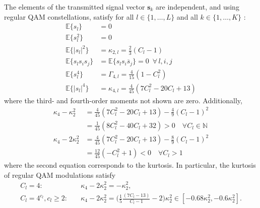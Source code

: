 The elements of the transmitted signal vector $\bm{s}_k$ are independent, and using regular QAM constellations, satisfy for all $l\in\{1,\ldots,L\}$ and all $k\in\{1,\ldots,K\}$ \cite{}:
\begin{subequations}
	\label{eqn:signal_moments}
	\begin{align}
	\mathbb{E}\{s_{l}\}&= 0\\
	\mathbb{E}\{s_{l}^2\}&=0\\
	\mathbb{E}\{|s_{l}|^2\}&=\kappa_{2,l}=\frac{2}{3}(C_l-1)\\
	\mathbb{E}\{s_{l}s_{i}s_j\}&=\mathbb{E}\{s_{l}s_{i}\overline{s}_j\}=0\,\,\,\forall\, l,i,j\\
	\mathbb{E}\{s_{l}^4\}&=\Gamma_{4,l}=\frac{4}{15}(1-C_l^2)\\
	\mathbb{E}\{|s_{l}|^4\}&=\kappa_{4,l}=\frac{4}{45}(7C_l^2-20C_l+13)
	\end{align}
\end{subequations}
where the  third- and fourth-order moments not shown are zero. 
Additionally, 
\begin{subequations}
	\label{eqn:kurtosis_bounds}
	\begin{align}
	\kappa_4-\kappa_2^2&=\frac{4}{45}(7C_l^2-20C_l+13)-\frac{4}{9}(C_l-1)^2\nonumber\\
	&=\frac{1}{45}(8C_l^2-40C_l+32)>0\quad\forall C_l\in\mathbb{N}\\
	\kappa_4-2\kappa_2^2&=\frac{4}{45}(7C_l^2-20C_l+13)-\frac{8}{9}(C_l-1)^2\nonumber\\
	&=\frac{12}{45}(-C_l^2+1)<0\quad\forall C_l>1
	\end{align}
\end{subequations}
where the second equation corresponds to the kurtosis. In particular, the kurtosis of regular QAM modulations satisfy 
\begin{align}
C_l=4:&\quad\kappa_4-2{\kappa_2^2}=-\kappa_2^2,\\
C_l=4^{c_l}, c_l\geq2: & \quad{\kappa_4}-2{\kappa_2^2}=\bigg(\frac{1}{5}\frac{(7C_l-13)}{C_l-1}-2\bigg)\kappa_2^2\in[-0.68\kappa_2^2, -0.6\kappa_2^2].
\end{align}
